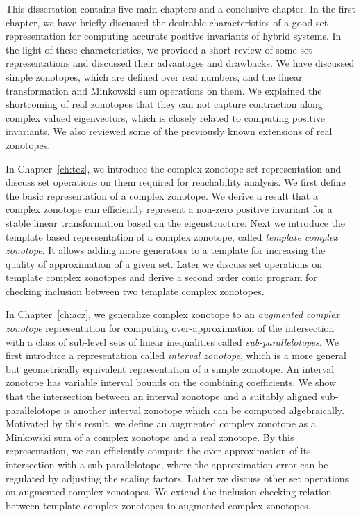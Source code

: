 This dissertation contains five main chapters and a conclusive
chapter.  In the first chapter, we have briefly discussed the
desirable characteristics of a good set representation for computing
accurate positive invariants of hybrid systems.  In the light of these
characteristics, we provided a short review of some set
representations and discussed their advantages and drawbacks.  We have
discussed simple zonotopes, which are defined over real numbers, and
the linear transformation and Minkowski sum operations on them. We
explained the shortcoming of real zonotopes that they can not capture
contraction along complex valued eigenvectors, which is closely
related to computing positive invariants.  We also reviewed some of
the previously known extensions of real zonotopes.

In Chapter~\ref{ch:tcz}, we introduce the complex zonotope set
representation and discuss set operations on them required for
reachability analysis.  We first define the basic representation of a
complex zonotope.  We derive a result that a complex zonotope can
efficiently represent a non-zero positive invariant for a stable
linear transformation based on the eigenstructure.  Next we introduce
the template based representation of a complex zonotope, called
\emph{template complex zonotope}.  It allows adding more generators to
a template for increasing the quality of approximation of a given set.
Later we discuss set operations on template complex zonotopes and
derive a second order conic program for checking inclusion between two
template complex zonotopes.

In Chapter~\ref{ch:acz}, we generalize complex zonotope to an
\emph{augmented complex zonotope} representation for computing
over-approximation of the intersection with a class of sub-level sets
of linear inequalities called \emph{sub-parallelotopes}.  We first
introduce a representation called \emph{interval zonotope}, which is a
more general but geometrically equivalent representation of a simple
zonotope.  An interval zonotope has variable interval bounds on the
combining coefficients.  We show that the intersection between an
interval zonotope and a suitably aligned sub-parallelotope is another
interval zonotope which can be computed algebraically.  Motivated by
this result, we define an augmented complex zonotope as a Minkowski
sum of a complex zonotope and a real zonotope.  By this
representation, we can efficiently compute the over-approximation of
its intersection with a sub-parallelotope, where the approximation
error can be regulated by adjusting the scaling factors.  Latter we
discuss other set operations on augmented complex zonotopes.  We
extend the inclusion-checking relation between template complex
zonotopes to augmented complex zonotopes.

